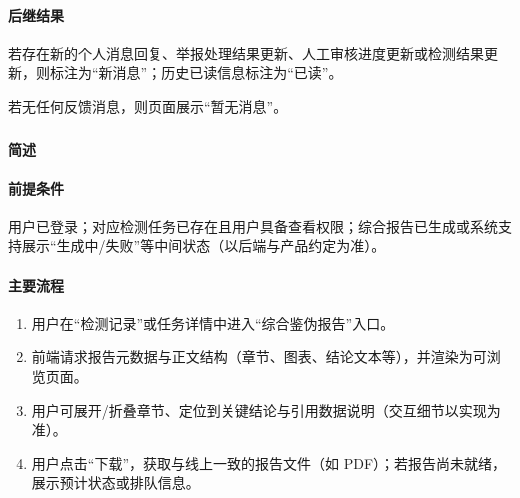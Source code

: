 \paragraph*{后继结果}

若存在新的个人消息回复、举报处理结果更新、人工审核进度更新或检测结果更新，则标注为“新消息”；历史已读信息标注为“已读”。

若无任何反馈消息，则页面展示“暂无消息”。

\subsubsection{}

\paragraph*{简述}


\paragraph*{前提条件}

用户已登录；对应检测任务已存在且用户具备查看权限；综合报告已生成或系统支持展示“生成中/失败”等中间状态（以后端与产品约定为准）。

\paragraph*{主要流程}

\begin{enumerate}
    \item 用户在“检测记录”或任务详情中进入“综合鉴伪报告”入口。
    \item 前端请求报告元数据与正文结构（章节、图表、结论文本等），并渲染为可浏览页面。
    \item 用户可展开/折叠章节、定位到关键结论与引用数据说明（交互细节以实现为准）。
    \item 用户点击“下载”，获取与线上一致的报告文件（如 PDF）；若报告尚未就绪，展示预计状态或排队信息。
\end{enumerate}

